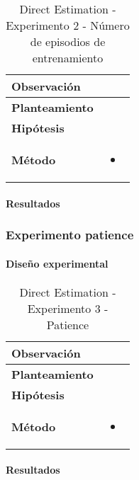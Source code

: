 \begin{table}[H]
    \centering
    \begin{tabularx}{\textwidth}{|p{4cm}|X|} %
        \hline %
        \textbf{Observación} &  
        \\ \hline 
        \textbf{Planteamiento} & 
        \\ \hline 
        \textbf{Hipótesis} & 
        \\ \hline 
        \textbf{Método} & 
        \begin{itemize}
            \item 
        \end{itemize}
        \\ \hline
    \end{tabularx}
    \caption{Direct Estimation - Experimento 2 - Número de episodios de entrenamiento}
    \label{tab:diseñoDirectEstimationExp2}
\end{table}

\paragraph{Resultados}

\subsubsection{Experimento patience}

\paragraph{Diseño experimental}

\begin{table}[H]
    \centering
    \begin{tabularx}{\textwidth}{|p{4cm}|X|} %
        \hline %
        \textbf{Observación} &  
        \\ \hline 
        \textbf{Planteamiento} & 
        \\ \hline 
        \textbf{Hipótesis} & 
        \\ \hline 
        \textbf{Método} & 
        \begin{itemize}
            \item 
        \end{itemize}
        \\ \hline
    \end{tabularx}
    \caption{Direct Estimation - Experimento 3 - Patience}
    \label{tab:diseñoDirectEstimationExp3}
\end{table}

\paragraph{Resultados}
